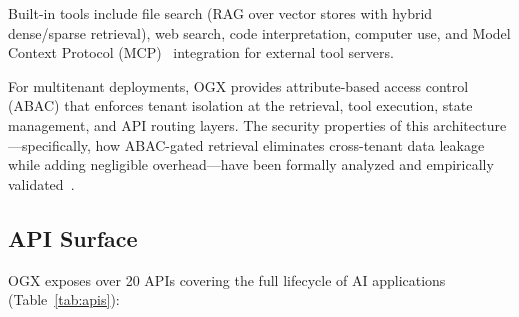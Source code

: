 \documentclass[11pt]{article}
\begin{document}
Built-in tools include file search (RAG over vector stores with hybrid dense/sparse retrieval), web search, code interpretation, computer use, and Model Context Protocol (MCP)~\cite{mcp} integration for external tool servers.

For multitenant deployments, OGX provides attribute-based access control (ABAC) that enforces tenant isolation at the retrieval, tool execution, state management, and API routing layers. The security properties of this architecture---specifically, how ABAC-gated retrieval eliminates cross-tenant data leakage while adding negligible overhead---have been formally analyzed and empirically validated~\cite{arceo2026securing}.

\subsection{API Surface}

OGX exposes over 20 APIs covering the full lifecycle of AI applications (Table~\ref{tab:apis}):
\end{document}
